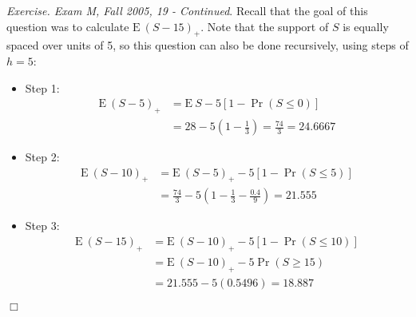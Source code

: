 \documentclass[12pt,letterpaper]{article}
\begin{document}
%
%
%





\noindent \textit{Exercise. Exam M, Fall 2005, 19 - Continued}. Recall that the goal of this question was to calculate $\mathrm{E~}(S-15)_+$. Note that the support of $S$ is equally spaced over units of 5, so this question can also be done recursively, using steps of $h=5$:

\begin{itemize}
\item Step 1:
	\begin{align*}
	\mathrm{E~}(S-5)_+ &= \mathrm{E~}S - 5 [1-\Pr(S \leq 0) ]\\ %
	&= 28 - 5 \left(1 - \frac{1}{3}\right) = \frac{74}{3}=24.6667
	\end{align*}
\item Step 2:
	\begin{align*}
	\mathrm{E~}(S-10)_+ &= \mathrm{E~}(S-5)_+ - 5 [1-\Pr(S \leq 5)]\\ %
	&= \frac{74}{3} - 5\left( 1 - \frac{1}{3} - \frac{0.4}{9}\right) = 21.555
	\end{align*}
\item Step 3:
	\begin{align*}
	\mathrm{E~}(S-15)_+ &= \mathrm{E~}(S-10)_+ - 5 [1-\Pr(S \leq 10)] \\ %
	&= \mathrm{E~}(S-10)_+ - 5\Pr (S\ge 15) \\
	&= 21.555 - 5 (0.5496) = 18.887
	\end{align*}
\end{itemize}
\begin{flushright}$\Box$\end{flushright}
\end{document}
